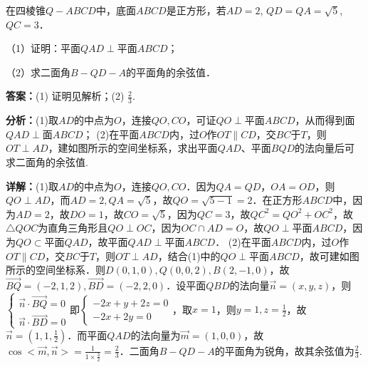 \begin{question}[points=12]
在四棱锥$Q-ABCD$中，底面$ABCD$是正方形，若$AD=2$, $QD=QA=\sqrt{5}$, $QC=3$．

（1）证明：平面$QAD\perp$平面$ABCD$；

（2）求二面角$B-QD-A$的平面角的余弦值．
\begin{solution}
\textbf{答案：}(1) 证明见解析；(2) $\frac{2}{3}$.

\textbf{分析：}(1)取$AD$的中点为$O$，连接$QO,CO$，可证$QO\perp$平面$ABCD$，从而得到面$QAD\perp$面$ABCD$； (2)在平面$ABCD$内，过$O$作$OT\parallel CD$，交$BC$于$T$，则$OT\perp AD$，建如图所示的空间坐标系，求出平面$QAD$、平面$BQD$的法向量后可求二面角的余弦值.

\textbf{详解：}(1)取$AD$的中点为$O$，连接$QO,CO$．因为$QA=QD$，$OA=OD$，则$QO\perp AD$，而$AD=2,QA=\sqrt{5}$，故$QO=\sqrt{5-1}=2$．在正方形$ABCD$中，因为$AD=2$，故$DO=1$，故$CO=\sqrt{5}$，因为$QC=3$，故$QC^2=QO^2+OC^2$，故$\triangle QOC$为直角三角形且$QO\perp OC$，因为$OC\cap AD=O$，故$QO\perp$平面$ABCD$，因为$QO\subset$平面$QAD$，故平面$QAD\perp$平面$ABCD$． (2)在平面$ABCD$内，过$O$作$OT\parallel CD$，交$BC$于$T$，则$OT\perp AD$，结合(1)中的$QO\perp$平面$ABCD$，故可建如图所示的空间坐标系．则$D(0,1,0),Q(0,0,2),B(2,-1,0)$，故$\overrightarrow{BQ}=(-2,1,2),\overrightarrow{BD}=(-2,2,0)$．设平面$QBD$的法向量$\vec{n}=(x,y,z)$，则$\begin{cases} \vec{n}\cdot\overrightarrow{BQ}=0 \\ \vec{n}\cdot\overrightarrow{BD}=0 \end{cases}$即$\begin{cases} -2x+y+2z=0 \\ -2x+2y=0 \end{cases}$，取$x=1$，则$y=1,z=\frac{1}{2}$，故$\vec{n}=(1,1,\frac{1}{2})$．而平面$QAD$的法向量为$\vec{m}=(1,0,0)$，故$\cos<\vec{m},\vec{n}>=\frac{1}{1\times\frac{3}{2}}=\frac{2}{3}$．二面角$B-QD-A$的平面角为锐角，故其余弦值为$\frac{2}{3}$.
\end{solution}
\end{question}

